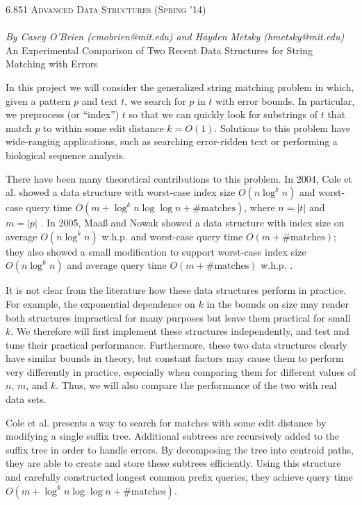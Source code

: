 \documentclass[11pt]{article}
\begin{document}
\begin{center} \Large
{\scshape 6.851 Advanced Data Structures (Spring '14)} \\[1ex]
 \\[1ex]
{\large \em By Casey O'Brien (cmobrien@mit.edu) and Hayden Metsky (hmetsky@mit.edu)} \\[2ex]
An Experimental Comparison of Two Recent Data Structures for String Matching with Errors
\end{center}

In this project we will consider the generalized string matching problem in which, given a pattern $p$ and text $t$, we search for $p$ in $t$ with error bounds.
In particular, we preprocess (or ``index'') $t$ so that we can quickly look for substrings of $t$ that match $p$ to within some edit distance $k = O(1)$.
Solutions to this problem have wide-ranging applications, such as searching error-ridden text or performing a biological sequence analysis.

There have been many theoretical contributions to this problem.
In 2004, Cole et al. showed a data structure with worst-case index size $O(n \log^k n)$ and worst-case query time $O(m + \log^k n \log \log n + \text{\# matches})$, where $n = |t|$ and $m = |p|$ \cite{cole}.
In 2005, Maa{\ss} and Nowak showed a data structure with index size on average $O(n \log^k n)$ w.h.p. and worst-case query time $O(m + \text{\# matches})$; they also showed a small modification to support worst-case index size $O(n \log^k n)$ and average query time $O(m + \text{\# matches})$ w.h.p. \cite{maas}.

It is not clear from the literature how these data structures perform in practice.
For example, the exponential dependence on $k$ in the bounds on size may render both structures impractical for many purposes but leave them practical for small $k$.
We therefore will first implement these structures independently, and test and tune their practical performance.
Furthermore, these two data structures clearly have similar bounds in theory, but constant factors may cause them to perform very differently in practice, especially when comparing them for different values of $n$, $m$, and $k$.
Thus, we will also compare the performance of the two with real data sets.

Cole et al. presents a way to search for matches with some edit distance by modifying a single suffix tree.
Additional subtrees are recursively added to the suffix tree in order to handle errors. 
By decomposing the tree into centroid paths, they are able to create and store these subtrees efficiently.
Using this structure and carefully constructed longest common prefix queries, they achieve query time $O(m + \log^k{n} \log{\log{n}} + \text{\# matches})$. 
\end{document}
